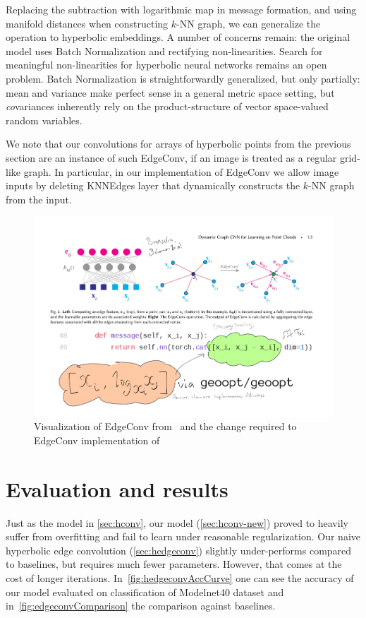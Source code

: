 Replacing the subtraction with logarithmic map in message formation, and using
manifold distances when constructing \( k \)-NN graph, we can generalize the
operation to hyperbolic embeddings. A number of concerns remain: the original
model uses Batch Normalization and rectifying non-linearities. Search for
meaningful non-linearities for hyperbolic neural networks remains an open
problem. Batch Normalization is straightforwardly generalized, but only
partially: mean and variance make perfect sense in a general metric space
setting, but \emph{co}variances inherently rely on the product-structure of
vector space-valued random variables.

We note that our convolutions for arrays of hyperbolic points from the previous
section are an instance of such EdgeConv, if an image is treated as a
regular grid-like graph. In particular, in our implementation of EdgeConv we
allow image inputs by deleting \textrm{KNNEdges} layer that dynamically
constructs the \( k \)-NN graph from the input.

\begin{figure}[H]\center
\includegraphics[width=.9\textwidth]{art/hyperbolic-edgeconv.pdf}
\caption{
    Visualization of EdgeConv from~\citet{edgeconv} and the change
        required to EdgeConv implementation of~\citet{pytorchGeometric}
}
\end{figure}

\section{Evaluation and results} \label{sec:results}

Just as the model in \autoref{sec:hconv}, our model (\autoref{sec:hconv-new})
proved to heavily suffer from overfitting and fail to learn under reasonable
regularization.  Our
naive hyperbolic edge convolution (\autoref{sec:hedgeconv}) slightly
under-performs compared to
baselines, but requires much fewer parameters. However, that comes at the cost of
longer iterations. In~\autoref{fig:hedgeconvAccCurve} one can see
the accuracy of our model evaluated on classification of Modelnet40
dataset and in~\autoref{fig:edgeconvComparison} the comparison
against baselines.

